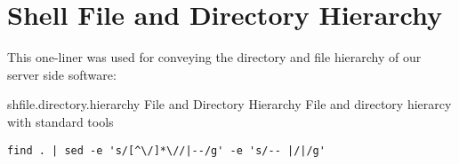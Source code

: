 \section{Shell File and Directory Hierarchy}
\label{section:source.code.hierarchy}

This one-liner was used for conveying the directory and file hierarchy of our
server side software:

\begin{scode}{sh}{file.directory.hierarchy}{%
   File and Directory Hierarchy}{%
  File and directory hierarcy with standard  tools}
\begin{lstlisting}
find . | sed -e 's/[^\/]*\//|--/g' -e 's/-- |/|/g'
\end{lstlisting}
\end{scode}


